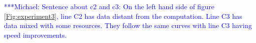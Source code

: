 \documentclass{rspublic}
\newcommand{\micnote}[1]{ {\textcolor{blue} { ***Michael: #1 }}}
\begin{document}
\micnote{Sentence about
c2 and c3: On the left hand side of figure \ref{Fig:experiment3}, line
C2 has data distant from the computation. Line C3 has data mixed with
some resources. They follow the same curves with line C3 having speed
improvements.} 
\begin{center}
\begin{figure}
\subfigure[Fig. \ref{Fig:experiment4:a} - Fig. \ref{Fig:experiment4:b}, i.e., $\Delta t_c$, $(c_s, N_c, fs, m) = (\mbox{144 MB, 8, CloudStore, Direct})$]
{
}
\end{figure}
\end{center}
\end{document}
